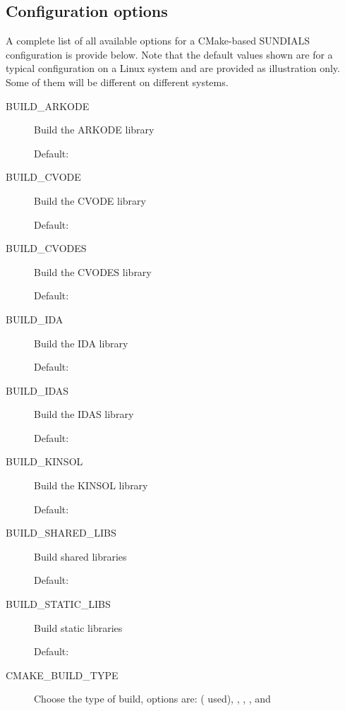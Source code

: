 \documentclass[letterpaper,10pt,english]{sphinxmanual}
\begin{document}
\subsection{Configuration options}
\label{Install:id2}
A complete list of all available options for a CMake-based SUNDIALS
configuration is provide below.  Note that the default values shown
are for a typical configuration on a Linux system and are provided as
illustration only. Some of them will be different on different
systems.
\begin{description}
\item[{BUILD\_ARKODE}] \leavevmode
Build the ARKODE library

Default: 

\item[{BUILD\_CVODE}] \leavevmode
Build the CVODE library

Default: 

\item[{BUILD\_CVODES}] \leavevmode
Build the CVODES library

Default: 

\item[{BUILD\_IDA}] \leavevmode
Build the IDA library

Default: 

\item[{BUILD\_IDAS}] \leavevmode
Build the IDAS library

Default: 

\item[{BUILD\_KINSOL}] \leavevmode
Build the KINSOL library

Default: 

\item[{BUILD\_SHARED\_LIBS}] \leavevmode
Build shared libraries

Default: 

\item[{BUILD\_STATIC\_LIBS}] \leavevmode
Build static libraries

Default: 

\item[{CMAKE\_BUILD\_TYPE}] \leavevmode
Choose the type of build, options are:
 ( used), , ,
, and 


\end{description}
\end{document}
